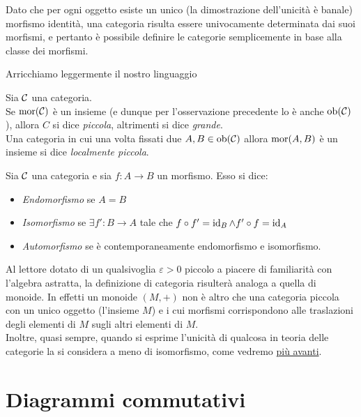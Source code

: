 \documentclass{article}
\begin{document}
\begin{observation}
    Dato che per ogni oggetto esiste un unico (la dimostrazione dell'unicità è banale) morfismo identità, una categoria risulta essere univocamente determinata dai suoi morfismi, e pertanto è possibile definire le categorie semplicemente in base alla classe dei morfismi.
\end{observation}

Arricchiamo leggermente il nostro linguaggio

\begin{definition}
    Sia $\mathcal{C}$ una categoria.\\
    Se $\operatorname{mor}(\mathcal{C})$ è un insieme (e dunque per l'osservazione precedente lo è anche $\operatorname{ob}(\mathcal{C})$), allora $C$ si dice \emph{piccola}, altrimenti si dice \emph{grande}.\\
    Una categoria in cui una volta fissati due $A,B \in \operatorname{ob}(\mathcal{C})$ allora $\operatorname{mor}(A,B)$ è un insieme si dice \emph{localmente piccola}.
\end{definition}

\begin{definition}
    Sia $\mathcal{C}$ una categoria e sia $f:A\to B$ un morfismo. Esso si dice:\begin{itemize}
        \item \emph{Endomorfismo} se $A=B$
        \item \emph{Isomorfismo} se $\exists f' : B\to A$ tale che $f \circ f' = \operatorname{id}_{B} \wedge f' \circ f = \operatorname{id}_{A}$
        \item \emph{Automorfismo} se è contemporaneamente endomorfismo e isomorfismo.
    \end{itemize}
\end{definition}

Al lettore dotato di un qualsivoglia $\varepsilon > 0$ piccolo a piacere di familiarità con l'algebra astratta, la definizione di categoria risulterà analoga a quella di monoide. In effetti un monoide $(M,+)$ non è altro che una categoria piccola con un unico oggetto (l'insieme $M$) e i cui morfismi corrispondono alle traslazioni degli elementi di $M$ sugli altri elementi di $M$.\\ Inoltre, quasi sempre, quando si esprime l'unicità di qualcosa in teoria delle categorie la si considera a meno di isomorfismo, come vedremo \hyperref[sec:Universal]{più avanti}.

\section{Diagrammi commutativi}
\label{sec:Diagrams}
\end{document}
